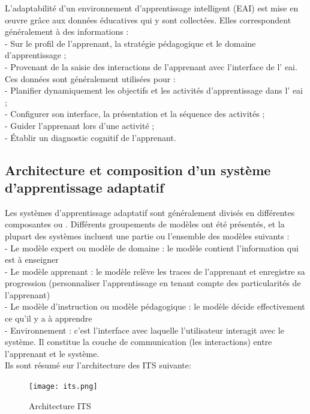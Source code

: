 \noindent

 L’adaptabilité d’un environnement d’apprentissage intelligent (EAI) est mise en œuvre grâce aux données éducatives qui y sont collectées. Elles correspondent généralement à des informations : \\
	-  Sur le profil de l’apprenant, la stratégie pédagogique et le domaine d’apprentissage ;\\
	-  Provenant de la saisie des interactions de l’apprenant avec l’interface de l’ \acrshort{eai}.\\
   Ces données sont généralement utilisées pour :\\
	-  Planifier dynamiquement les objectifs et les activités d’apprentissage dans l’ \acrshort{eai} ;\\
	-  Configurer son interface, la présentation et la séquence des activités ; \\
	-  Guider l'apprenant lors d'une activité ; \\
	-  Établir un diagnostic cognitif de l’apprenant.

\subsection{Architecture et composition d’un système d’apprentissage adaptatif}

Les systèmes d’apprentissage adaptatif sont généralement divisés en différentes composantes ou . Différents groupements de modèles ont été présentés, et la plupart des systèmes incluent une partie ou l’ensemble des modèles suivants : \\
	- Le modèle expert ou modèle de domaine : le modèle contient l’information qui est à enseigner \\
	- Le modèle apprenant : le modèle relève les traces de l’apprenant et enregistre sa progression (personnaliser l’apprentissage en tenant compte des particularités de l’apprenant)\\
	- Le modèle d’instruction ou modèle pédagogique : le modèle décide effectivement ce qu’il y a à apprendre \\
	- Environnement : c’est l’interface avec laquelle l’utilisateur interagit avec le système. Il constitue la couche de communication (les interactions) entre l’apprenant et le système. \\
	Ils sont résumé sur l'architecture des ITS suivante:
	
	\begin{figure}[!ht]
		\centering
		\texttt{[image: its.png]} 
		\caption{Architecture ITS}
		\label{ferme}
	\end{figure}


